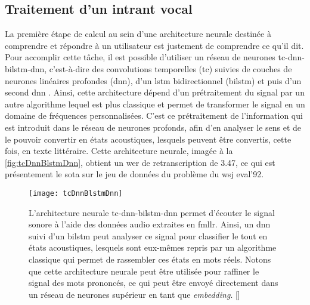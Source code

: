 \subsection{Traitement d'un intrant vocal}
La première étape de calcul au sein d’une architecture neurale destinée à comprendre et répondre à un utilisateur est justement de comprendre ce qu’il dit. Pour accomplir cette tâche, il est possible d’utiliser un réseau de neurones \gls{tc}-\gls{dnn}-\gls{bilstm}-\gls{dnn}, c’est-à-dire des convolutions temporelles (\gls{tc}) suivies de couches de neurones linéaires profondes (\gls{dnn}), d’un \gls{lstm} bidirectionnel (\gls{bilstm}) et puis d’un second \gls{dnn} \cite{acousticModeling}. Ainsi, cette architecture dépend d’un prétraitement du signal par un autre algorithme lequel est plus classique et permet de transformer le signal en un domaine de fréquences personnalisées. C’est ce prétraitement de l’information qui est introduit dans le réseau de neurones profonds, afin d’en analyser le sens et de le pouvoir convertir en états acoustiques, lesquels peuvent être convertis, cette fois, en texte littéraire. Cette architecture neurale, imagée à la \autoref{fig:tcDnnBlstmDnn}, obtient un \gls{wer} de retranscription de 3.47, ce qui est présentement le \gls{sota} sur le jeu de données du problème du \gls{wsj} eval’92.

\begin{figure*}
  \centering
  \texttt{[image: tcDnnBlstmDnn]}
  \caption{L’architecture neurale \gls{tc}-\gls{dnn}-\gls{bilstm}-\gls{dnn} permet d’écouter le signal sonore à l’aide des données audio extraites en \gls{fmllr}. Ainsi, un \gls{dnn} suivi d’un \gls{bilstm} peut analyser ce signal pour classifier le tout en états acoustiques, lesquels sont eux-mêmes repris par un algorithme classique qui permet de rassembler ces états en mots réels. Notons que cette architecture neurale peut être utilisée pour raffiner le signal des mots prononcés, ce qui peut être envoyé directement dans un réseau de neurones supérieur en tant que \textit{embedding}. []}
  \label{fig:tcDnnBlstmDnn}
\end{figure*}
